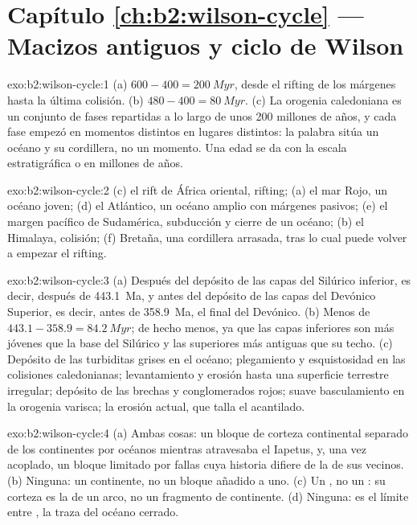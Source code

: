 \section*{Capítulo \ref{ch:b2:wilson-cycle} --- Macizos antiguos y ciclo de Wilson}

\begin{solution}{exo:b2:wilson-cycle:1}
(a) $600 - 400 = \qty{200}{Myr}$, desde el rifting de los márgenes hasta la última colisión.
(b) $480 - 400 = \qty{80}{Myr}$. (c) La orogenia caledoniana es un conjunto de fases repartidas a lo largo de
unos 200 millones de años, y cada fase empezó en momentos distintos en lugares distintos: la palabra
sitúa un océano y su cordillera, no un momento. Una edad se da con la escala estratigráfica o en
millones de años.
\end{solution}

\begin{solution}{exo:b2:wilson-cycle:2}
(c) el rift de África oriental, rifting; (a) el mar Rojo, un océano joven; (d) el Atlántico, un océano
amplio con márgenes pasivos; (e) el margen pacífico de Sudamérica, subducción y
cierre de un océano; (b) el Himalaya, colisión; (f) Bretaña, una cordillera arrasada, tras lo cual
puede volver a empezar el rifting.
\end{solution}

\begin{solution}{exo:b2:wilson-cycle:3}
(a) Después del depósito de las capas del Silúrico inferior, es decir, después de \qty{443.1}{Ma}, y antes del
depósito de las capas del Devónico Superior, es decir, antes de \qty{358.9}{Ma}, el final del Devónico.
(b) Menos de $443.1 - 358.9 = \qty{84.2}{Myr}$; de hecho menos, ya que las capas inferiores son más jóvenes
que la base del Silúrico y las superiores más antiguas que su techo. (c) Depósito de las
turbiditas grises en el océano; plegamiento y esquistosidad en las colisiones caledonianas; levantamiento y
erosión hasta una superficie terrestre irregular; depósito de las brechas y conglomerados rojos; suave
basculamiento en la orogenia varisca; la erosión actual, que talla el acantilado.
\end{solution}

\begin{solution}{exo:b2:wilson-cycle:4}
(a) Ambas cosas: un bloque de corteza continental separado de los continentes por océanos mientras
atravesaba el Iapetus, y, una vez acoplado, un bloque limitado por fallas cuya historia difiere de la de sus
vecinos. (b) Ninguna: un continente, no un bloque añadido a uno. (c) Un , no un
: su corteza es la de un arco, no un fragmento de continente. (d) Ninguna: es
el límite entre , la traza del océano cerrado.
\end{solution}

